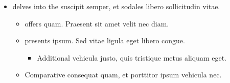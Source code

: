 \documentclass[
]{article}
\providecommand{\tightlist}{%
  \setlength{\itemsep}{0pt}\setlength{\parskip}{0pt}}
\begin{document}
\begin{itemize}
\tightlist
\item
  delves into the suscipit semper, et sodales libero sollicitudin vitae.

  \begin{itemize}
  \tightlist
  \item
    offers quam. Praesent sit amet velit nec diam.
  \item
    presents ipsum. Sed vitae ligula eget libero congue.

    \begin{itemize}
    \tightlist
    \item
      Additional vehicula justo, quis tristique metus aliquam eget.
    \end{itemize}
  \item
    Comparative consequat quam, et porttitor ipsum vehicula nec.
  \end{itemize}
\end{itemize}
\end{document}

